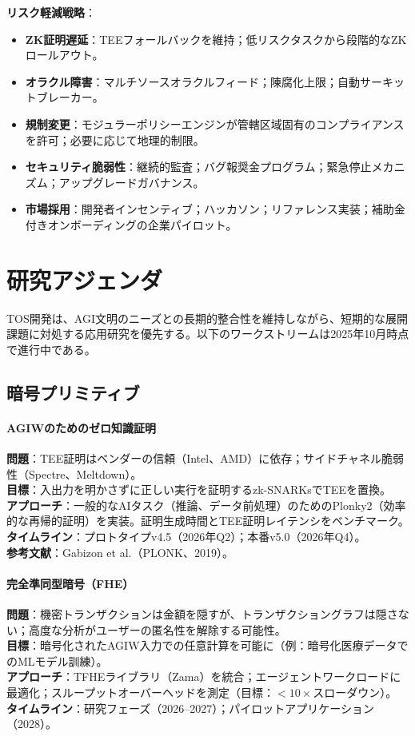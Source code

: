 \documentclass[11pt]{article}
\begin{document}
\textbf{リスク軽減戦略}：
\begin{itemize}[noitemsep]
  \item \textbf{ZK証明遅延}：TEEフォールバックを維持；低リスクタスクから段階的なZKロールアウト。
  \item \textbf{オラクル障害}：マルチソースオラクルフィード；陳腐化上限；自動サーキットブレーカー。
  \item \textbf{規制変更}：モジュラーポリシーエンジンが管轄区域固有のコンプライアンスを許可；必要に応じて地理的制限。
  \item \textbf{セキュリティ脆弱性}：継続的監査；バグ報奨金プログラム；緊急停止メカニズム；アップグレードガバナンス。
  \item \textbf{市場採用}：開発者インセンティブ；ハッカソン；リファレンス実装；補助金付きオンボーディングの企業パイロット。
\end{itemize}

\section{研究アジェンダ}
\label{sec:research}

TOS開発は、AGI文明のニーズとの長期的整合性を維持しながら、短期的な展開課題に対処する応用研究を優先する。以下のワークストリームは2025年10月時点で進行中である。

\subsection{暗号プリミティブ}

\paragraph{AGIWのためのゼロ知識証明}
\textbf{問題}：TEE証明はベンダーの信頼（Intel、AMD）に依存；サイドチャネル脆弱性（Spectre、Meltdown）。\\
\textbf{目標}：入出力を明かさずに正しい実行を証明するzk-SNARKsでTEEを置換。\\
\textbf{アプローチ}：一般的なAIタスク（推論、データ前処理）のためのPlonky2（効率的な再帰的証明）を実装。証明生成時間とTEE証明レイテンシをベンチマーク。\\
\textbf{タイムライン}：プロトタイプv4.5（2026年Q2）；本番v5.0（2026年Q4）。\\
\textbf{参考文献}：Gabizon et al.（PLONK、2019）。

\paragraph{完全準同型暗号（FHE）}
\textbf{問題}：機密トランザクションは金額を隠すが、トランザクショングラフは隠さない；高度な分析がユーザーの匿名性を解除する可能性。\\
\textbf{目標}：暗号化されたAGIW入力での任意計算を可能に（例：暗号化医療データでのMLモデル訓練）。\\
\textbf{アプローチ}：TFHEライブラリ（Zama）を統合；エージェントワークロードに最適化；スループットオーバーヘッドを測定（目標：$<10\times$スローダウン）。\\
\textbf{タイムライン}：研究フェーズ（2026--2027）；パイロットアプリケーション（2028）。
\end{document}
